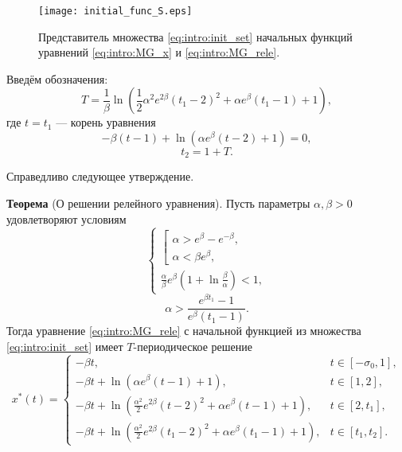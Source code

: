 \begin{figure}
	\centering
	\texttt{[image: initial\_func\_S.eps]}
	\caption{Представитель множества \eqref{eq:intro:init_set} начальных функций уравнений \eqref{eq:intro:MG_x} и \eqref{eq:intro:MG_rele}.}
	\label{fig:intro:initial_funcs:ch1}
\end{figure}

Введём обозначения:
\begin{equation}
	\label{eq:intro:T}
	T = \frac{1}{\beta} \ln\left(\frac{1}{2}\alpha^2e^{2\beta}(t_1 - 2)^2 + \alpha e^{\beta}(t_1 - 1) + 1\right),
\end{equation}
где $t = t_1$ --- корень уравнения 
\begin{equation}
	\label{eq:intro:t1_cond_exp}
	-\beta(t - 1) + \ln(\alpha e^{\beta}(t - 2) + 1) = 0,
\end{equation}
\begin{equation}
	\label{eq:intro:t2_period}
	t_2 = 1 + T.
\end{equation}

Справедливо следующее утверждение.

\textbf{Теорема} (О решении релейного уравнения).
	Пусть параметры $\alpha, \beta > 0$ удовлетворяют условиям
	\begin{equation}
		\label{eq:intro:cond_alpha1}
		\begin{cases}
			\left[
			\begin{array}{ll}
				\alpha > e^{\beta} - e^{-\beta},\\
				\alpha < \beta e^{\beta},
			\end{array}
			\right.\\
			\frac{\alpha}{\beta}e^{\beta}\left(1 + \ln\frac{\beta}{\alpha}\right) < 1,
		\end{cases}
	\end{equation}
	\begin{equation}
		\label{eq:intro:cond_alpha2}
		\alpha > \dfrac{e^{\beta t_1} - 1}{e^{\beta}(t_1 - 1)}.
	\end{equation}
	Тогда уравнение \eqref{eq:intro:MG_rele} с начальной функцией из множества \eqref{eq:intro:init_set} имеет $T$-периодическое решение
	\small
	\begin{equation}
		\label{eq:intro:sol_x_star}
		x^*(t)= 
		\begin{cases}
			-\beta t, & t\in[-\sigma_0, 1],\\
			-\beta t +\ln(\alpha e^{\beta}(t - 1)+1), & t\in[1, 2],\\
			-\beta t + \ln(\frac{\alpha^2}{2}e^{2\beta}(t - 2)^2+\alpha e^{\beta}(t - 1)+1), & t\in[2, t_1],\\
			-\beta t + \ln(\frac{\alpha^2}{2}e^{2\beta}(t_1 - 2)^2+\alpha e^{\beta}(t_1 - 1) + 1), & t\in[t_1, t_2].
		\end{cases}
	\end{equation}
	\normalsize


